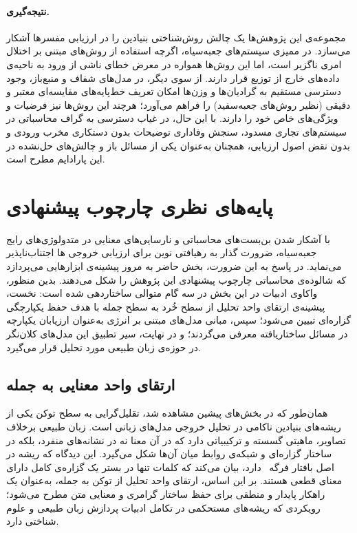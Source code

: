 \paragraph{نتیجه‌گیری.}

مجموعه‌ی این پژوهش‌ها یک چالش روش‌شناختی بنیادین را در ارزیابی مفسرها آشکار می‌سازد. در ممیزی سیستم‌های جعبه‌سیاه، اگرچه استفاده از روش‌های مبتنی بر اختلال امری ناگزیر است، اما این روش‌ها همواره در معرض خطای ناشی از ورود به ناحیه‌ی داده‌های خارج از توزیع قرار دارند. از سوی دیگر، در مدل‌های شفاف و منبع‌باز، وجود دسترسی مستقیم به گرادیان‌ها و وزن‌ها امکان تعریف خط‌پایه‌های مقایسه‌ای معتبر و دقیقی (نظیر روش‌های جعبه‌سفید) را فراهم می‌آورد؛ هرچند این روش‌ها نیز فرضیات و ویژگی‌های خاص خود را دارند. با این حال، در غیاب دسترسی به گراف محاسباتی در سیستم‌های تجاری مسدود، سنجش وفاداری توضیحات بدون دستکاری مخرب ورودی و بدون نقض اصول ارزیابی، همچنان به‌عنوان یکی از مسائل باز و چالش‌های حل‌نشده در این پارادایم مطرح است.






\section{پایه‌های نظری چارچوب پیشنهادی}\label{sec:3-2}

با آشکار شدن بن‌بست‌های محاسباتی و نارسایی‌های معنایی در متدولوژی‌های رایج جعبه‌سیاه، ضرورت گذار به رهیافتی نوین برای ارزیابی خروجی ها اجتناب‌ناپذیر می‌نماید. در پاسخ به این ضرورت، بخش حاضر به مرور پیشینه‌ی ابزارهایی می‌پردازد که شالوده‌ی محاسباتی چارچوب پیشنهادی این پژوهش را شکل می‌دهند. بدین منظور، واکاوی ادبیات در این بخش در سه گام متوالی ساختاردهی شده است: نخست، پیشینه‌ی ارتقای واحد تحلیل از سطح خُرد به سطح جمله با هدف حفظ یکپارچگی گزاره‌ای تبیین می‌شود؛ سپس، مبانی مدل‌های مبتنی بر انرژی به‌عنوان ارزیابان یکپارچه در مسائل ساختاریافته معرفی می‌گردند؛ و در نهایت، سیر تطبیق این مدل‌های کلان‌نگر در حوزه‌ی زبان طبیعی مورد تحلیل قرار می‌گیرد.


\subsection{ارتقای واحد معنایی به جمله}\label{sec:3-2-1}

همان‌طور که در بخش‌های پیشین مشاهده شد، تقلیل‌گرایی به سطح توکن یکی از ریشه‌های بنیادین ناکامی در تحلیل خروجی مدل‌های زبانی است. زبان طبیعی برخلاف تصاویر، ماهیتی گسسته و ترکیبیاتی دارد که در آن معنا نه در نشانه‌های منفرد، بلکه در ساختار گزاره‌ای و شبکه‌ی روابط میان آن‌ها شکل می‌گیرد. این دیدگاه که ریشه در اصل بافتار فرگه~\cite{frege1991foundations} دارد، بیان می‌کند که کلمات تنها در بستر یک گزاره‌ی کامل دارای معنای قطعی هستند. بر این اساس، ارتقای واحد تحلیل از توکن به جمله، به‌عنوان یک راهکار پایدار و منطقی برای حفظ ساختار گرامری و معنایی متن مطرح می‌شود؛ رویکردی که ریشه‌های مستحکمی در تکامل ادبیات پردازش زبان طبیعی و علوم شناختی دارد.


